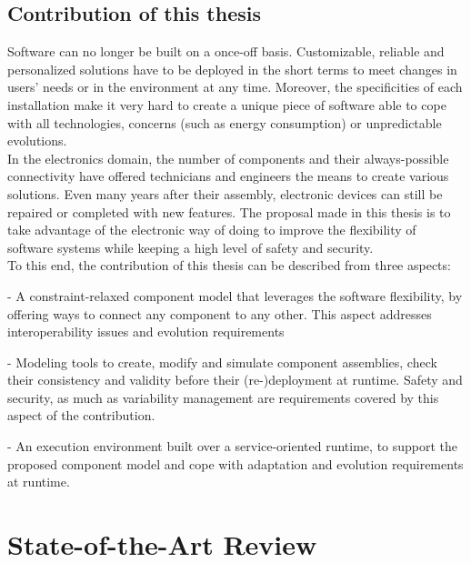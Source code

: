 \newpage
\section{Contribution of this thesis}
\label{sec:introContrib}

Software can no longer be built on a once-off basis. Customizable, reliable and personalized solutions have to be deployed in the short terms to meet changes in users' needs or in the environment at any time. Moreover, the specificities of each installation make it very hard to create a unique piece of software able to cope with all technologies, concerns (such as energy consumption) or unpredictable evolutions.\\

In the electronics domain, the number of components and their always-possible connectivity have offered technicians and engineers the means to create various solutions. Even many years after their assembly, electronic devices can still be repaired or completed with new features. The proposal made in this thesis is to take advantage of the electronic way of doing to improve the flexibility of software systems while keeping a high level of safety and security.\\
To this end, the contribution of this thesis can be described from three aspects:
\par - A constraint-relaxed component model that leverages the software flexibility, by offering ways to connect any component to any other. This aspect addresses interoperability issues and evolution requirements
\par - Modeling tools to create, modify and simulate component assemblies, check their consistency and validity before their (re-)deployment at runtime. Safety and security, as much as variability management are requirements covered by this aspect of the contribution.
\par - An execution environment built over a service-oriented runtime, to support the proposed component model and cope with adaptation and evolution requirements at runtime.\\


\chapter{State-of-the-Art Review}
\label{ch:survey}

